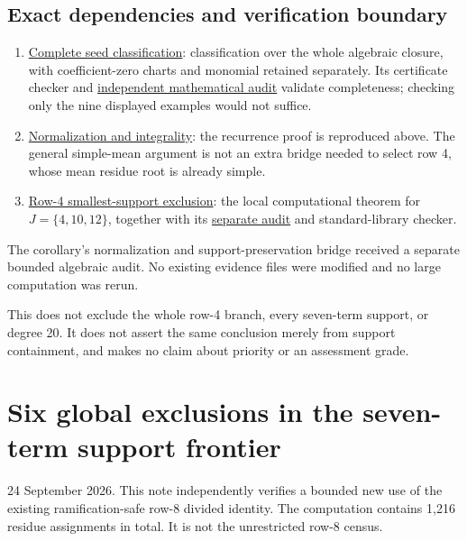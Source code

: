 \documentclass[
  british,
  10pt,
]{article}
\providecommand{\tightlist}{%
  \setlength{\itemsep}{0pt}\setlength{\parskip}{0pt}}
\begin{document}
\subsection{Exact dependencies and verification
boundary}\label{exact-dependencies-and-verification-boundary}

\begin{enumerate}
\def\labelenumi{\arabic{enumi}.}
\tightlist
\item
  \href{evidence/full/support_frontier/prime17/CLASSIFICATION.md}{Complete
  seed classification}: classification over the whole algebraic closure,
  with coefficient-zero charts and monomial retained separately. Its
  certificate checker and
  \href{evidence/full/literature/PRIME17_CLASSIFICATION_AUDIT.md}{independent
  mathematical audit} validate completeness; checking only the nine
  displayed examples would not suffice.
\item
  \href{evidence/full/LIFT_CONSEQUENCES_17.md}{Normalization and
  integrality}: the recurrence proof is reproduced above. The general
  simple-mean argument is not an extra bridge needed to select row 4,
  whose mean residue root is already simple.
\item
  \href{evidence/full/tame17/ROW4_SMALLEST_SUPPORT_EXCLUSION.md}{Row-4
  smallest-support exclusion}: the local computational theorem for
  \(J=\{4,10,12\}\), together with its
  \href{evidence/full/tame17/ROW4_SMALLEST_SUPPORT_AUDIT.md}{separate
  audit} and standard-library checker.
\end{enumerate}

The corollary's normalization and support-preservation bridge received a
separate bounded algebraic audit. No existing evidence files were
modified and no large computation was rerun.

This does not exclude the whole row-4 branch, every seven-term support,
or degree 20. It does not assert the same conclusion merely from support
containment, and makes no claim about priority or an assessment grade.

\section{Six global exclusions in the seven-term support
frontier}\label{six-global-exclusions-in-the-seven-term-support-frontier}

24 September 2026. This note independently verifies a bounded new use of
the existing ramification-safe row-8 divided identity. The computation
contains 1,216 residue assignments in total. It is not the unrestricted
row-8 census.
\end{document}

